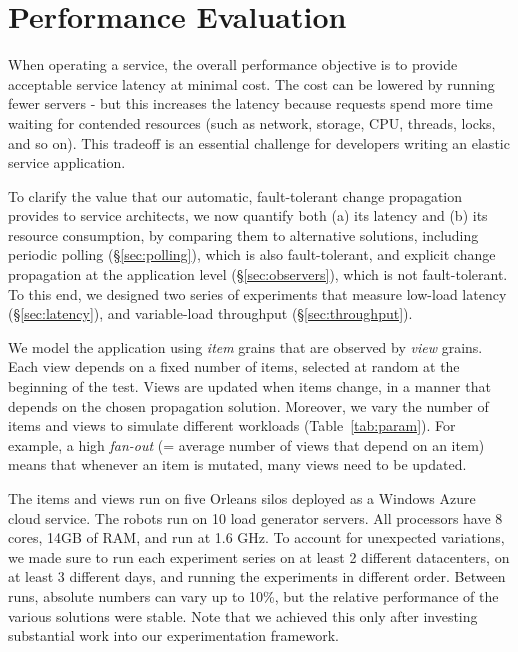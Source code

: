\section{Performance Evaluation}\label{sec:evaluation}

When operating a service, the overall performance objective is to provide acceptable service latency at minimal cost. The cost can be lowered by running fewer servers - but this increases the latency because requests spend more time waiting for contended resources (such as network, storage, CPU, threads, locks, and so on). This tradeoff is an essential challenge for developers writing an elastic service application. 

To clarify the value that our automatic, fault-tolerant change propagation provides to service architects, we now quantify both (a) its latency and (b) its resource consumption, by comparing them to alternative solutions, including periodic polling (\S\ref{sec:polling}), which is also fault-tolerant, and explicit change propagation at the application level (\S\ref{sec:observers}), which is not fault-tolerant. To this end, we designed two series of experiments that measure low-load latency (\S\ref{sec:latency}), and variable-load throughput (\S\ref{sec:throughput}).

We model the application using  \emph{item} grains that are observed by \emph{view} grains. Each view depends on a fixed number of items, selected at random at the beginning of the test. Views are updated when items change, in a manner that depends on the chosen propagation solution.
Moreover, we vary the number of items and views to simulate different workloads (Table~\ref{tab:param}).  For example, a high \emph{fan-out} (= average number of views that depend on an item) means that whenever an item is mutated, many views need to be updated. 

The items and views run on five Orleans silos deployed as a Windows Azure cloud service. The robots run on 10 load generator servers. All processors have 8 cores, 14GB of RAM, and run at 1.6 GHz. To account for unexpected variations, we made sure to run each experiment series on at least 2 different datacenters, on at least 3 different days, and running the experiments in different order. Between runs, absolute numbers can vary up to 10\%, but the relative performance of the various solutions were stable. Note that we achieved this only after investing substantial work into our experimentation framework. 

